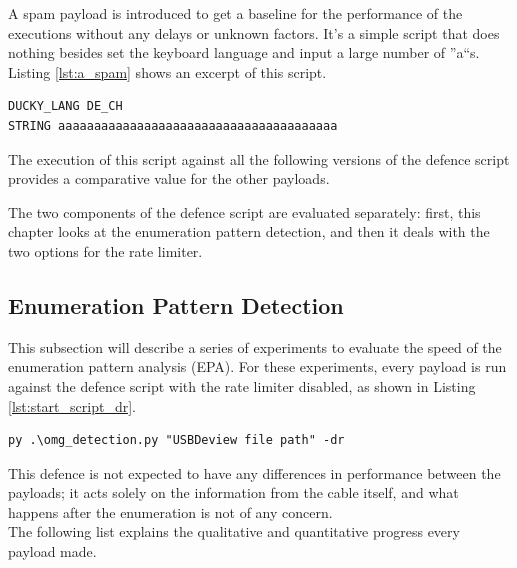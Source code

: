  A spam payload is introduced to get a baseline for the performance of the executions without any delays or unknown factors. It's a simple script that does nothing besides set the keyboard language and input a large number of ''a``s. Listing \ref{lst:a_spam} shows an excerpt of this script. 


\begin{lstlisting}[caption={Excerpt: write 2670 'a's without delays},label=lst:a_spam, captionpos=b]
DUCKY_LANG DE_CH
STRING aaaaaaaaaaaaaaaaaaaaaaaaaaaaaaaaaaaaaaa
\end{lstlisting}

The execution of this script against all the following versions of the defence script provides a comparative value for the other payloads.

The two components of the defence script are evaluated separately: first, this chapter looks at the enumeration pattern detection, and then it deals with the two options for the rate limiter.


\subsection{Enumeration Pattern Detection}

This subsection will describe a series of experiments to evaluate the speed of the enumeration pattern analysis (EPA). For these experiments, every payload is run against the defence script with the rate limiter disabled, as shown in Listing \ref{lst:start_script_dr}.

\begin{lstlisting}[caption={start Defense Script with Rate Limiter disabled},label={lst:start_script_dr}, captionpos=b]
 py .\omg_detection.py "USBDeview file path" -dr
\end{lstlisting}

This defence is not expected to have any differences in performance between the payloads; it acts solely on the information from the cable itself, and what happens after the enumeration is not of any concern. \\
The following list explains the qualitative and quantitative progress every payload made.

